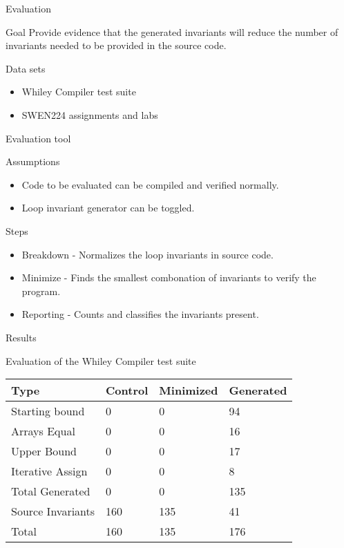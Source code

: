 \begin{frame}{Evaluation}

\begin{block}{Goal}
Provide evidence that the generated invariants will reduce the
number of invariants needed to be provided in the source code.
\end{block}

\begin{block}{Data sets}

\begin{itemize}
\item Whiley Compiler test suite
\item SWEN224 assignments and labs
\end{itemize}

\end{block}

\end{frame}


\begin{frame}{Evaluation tool}

\begin{block}{Assumptions}

\begin{itemize}
\item Code to be evaluated can be compiled and verified normally.
\item Loop invariant generator can be toggled.
\end{itemize}

\end{block}


\begin{block}{Steps}
\begin{itemize}
\item Breakdown - Normalizes the loop invariants in source code.
\item Minimize - Finds the smallest combonation of invariants to verify
the program.
\item Reporting - Counts and classifies the invariants present.
\end{itemize}
\end{block}

\end{frame}


\begin{frame}{Results}

Evaluation of the Whiley Compiler test suite

\begin{longtable}[]{@{}llll@{}}
\toprule
    Type & Control & Minimized & Generated\tabularnewline
\midrule
\endhead
Starting bound & 0 & 0 & 94\tabularnewline
Arrays Equal & 0 & 0 & 16\tabularnewline
Upper Bound & 0 & 0 & 17\tabularnewline
Iterative Assign & 0 & 0 & 8\tabularnewline
Total Generated & 0 & 0 & 135\tabularnewline
\hline
Source Invariants & 160 & 135 & 41\tabularnewline
\bottomrule
Total & 160 & 135 & 176\tabularnewline
\end{longtable}

\end{frame}



